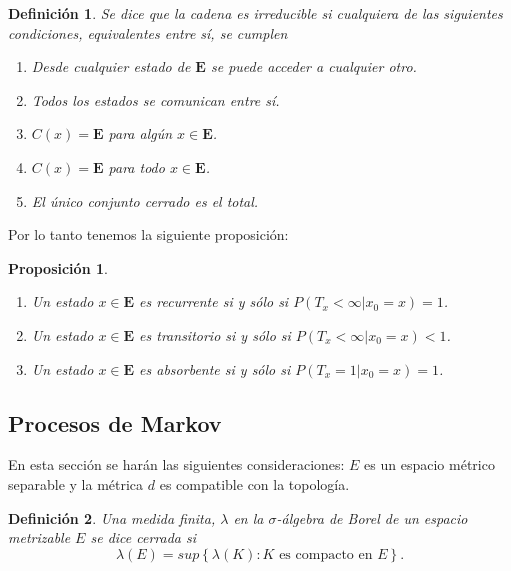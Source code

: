 \documentclass{article}
\newtheorem{Def}{Definición}[section]
\newtheorem{Prop}{Proposición}[section]
\newcommand{\Eb}{\mathbf{E}}
\numberwithin{equation}{section}
\begin{document}
\begin{Def}
Se dice que la cadena es irreducible si cualquiera de las siguientes condiciones, equivalentes entre s\'i,  se cumplen
\begin{enumerate}
\item[a) ] Desde cualquier estado de $\Eb$ se puede acceder a cualquier otro.

\item[b) ] Todos los estados se comunican entre s\'i.

\item[c) ] $C\left(x\right)=\Eb$ para alg\'un $x\in\Eb$.

\item[d) ] $C\left(x\right)=\Eb$ para todo $x\in\Eb$.

\item[e) ] El \'unico conjunto cerrado es el total.
\end{enumerate}
\end{Def}
Por lo tanto tenemos la siguiente proposici\'on:
\begin{Prop}
\begin{enumerate}
\item[a) ] Un estado $x\in\Eb$ es recurrente si y s\'olo si $P\left(T_{x}<\infty|x_{0}=x\right)=1$.

\item[b) ] Un estado $x\in\Eb$ es transitorio si y s\'olo si $P\left(T_{x}<\infty|x_{0}=x\right)<1$.

\item[c) ] Un estado $x\in\Eb$ es absorbente si y s\'olo si $P\left(T_{x}=1|x_{0}=x\right)=1$.


\end{enumerate}
\end{Prop}

\subsection*{Procesos de Markov}
En esta secci\'on se har\'an las siguientes consideraciones: $E$ es un espacio m\'etrico separable y la m\'etrica $d$ es compatible con la topolog\'ia.

\begin{Def}
Una medida finita, $\lambda$ en la $\sigma$-\'algebra de Borel de un espacio metrizable $E$ se dice cerrada si
\begin{equation}\label{Eq.A2.3}
\lambda\left(E\right)=sup\left\{\lambda\left(K\right):K\textrm{ es
compacto en }E\right\}.
\end{equation}
\end{Def}
\end{document}

